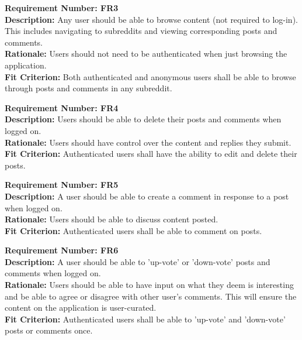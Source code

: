 \documentclass[12pt,fleqn]{article}
\begin{document}
\begin{tcolorbox}
\textbf{Requirement Number: FR3} \\
\textbf{Description:} Any user should be able to browse content (not required to log-in).  This includes navigating to subreddits and viewing corresponding posts and comments. \\
\textbf{Rationale:} Users should not need to be authenticated when just browsing the application.\\
\textbf{Fit Criterion:} Both authenticated and anonymous users shall be able to browse through posts and comments in any subreddit.
\end{tcolorbox}

\begin{tcolorbox}
\textbf{Requirement Number: FR4} \\
\textbf{Description:} Users should be able to delete their posts and comments when logged on. \\
\textbf{Rationale:} Users should have control over the content and replies they submit. \\
\textbf{Fit Criterion:} Authenticated users shall have the ability to edit and delete their posts.
\end{tcolorbox}

\begin{tcolorbox}
\textbf{Requirement Number: FR5} \\
\textbf{Description:} A user should be able to create a comment in response to a post when logged on. \\
\textbf{Rationale:} Users should be able to discuss content posted. \\
\textbf{Fit Criterion:} Authenticated users shall be able to comment on posts.
\end{tcolorbox}

\begin{tcolorbox}
\textbf{Requirement Number: FR6} \\
\textbf{Description:} A user should be able to 'up-vote' or 'down-vote' posts and comments when logged on. \\
\textbf{Rationale:} Users should be able to have input on what they deem is interesting and be able to agree or disagree with other user's comments.  This will ensure the content on the application is user-curated. \\
\textbf{Fit Criterion:} Authenticated users shall be able to 'up-vote' and 'down-vote' posts or comments once.
\end{tcolorbox}
\end{document}

